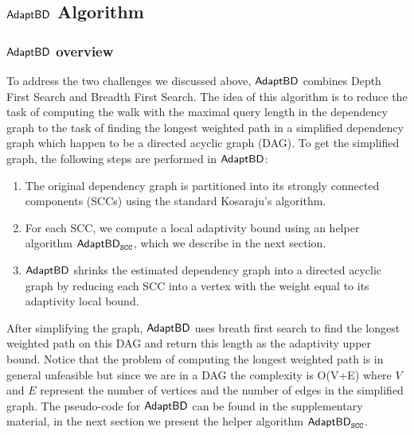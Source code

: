 \subsection{$\mathsf{AdaptBD}$ Algorithm}

\subsubsection{$\mathsf{AdaptBD}$ overview} To address the two challenges we discussed above,  $\mathsf{AdaptBD}$  combines
Depth First Search and Breadth First Search. 
The idea of this algorithm is to reduce the task of computing the
walk with the maximal query length in the dependency graph to the task of
finding the longest weighted path in a simplified dependency graph which happen to be a directed acyclic graph (DAG).
To get the simplified graph, the following steps are performed in $\mathsf{AdaptBD}$:
\begin{enumerate}
  \item The original dependency graph is partitioned into  
  its strongly connected components (SCCs) using the standard Kosaraju’s algorithm. 
  \item  For each SCC, we compute a local adaptivity bound using an helper algorithm $\mathsf{AdaptBD}_{\mathtt{SCC}}$, which we describe in the next section.
  \item  $\mathsf{AdaptBD}$ shrinks the estimated dependency graph into a directed acyclic graph
  by reducing each SCC into a vertex with the weight equal to its adaptivity local bound.
\end{enumerate}
After simplifying the graph, $\mathsf{AdaptBD}$ uses breath first search  to find the longest
weighted path on this DAG and return this length as the adaptivity upper bound. Notice that the problem of computing the longest weighted path is in general unfeasible but since we are in a DAG the complexity is O(V+E) where $V$ and $E$ represent the number of vertices and the number of edges 
in the simplified graph. The pseudo-code for $\mathsf{AdaptBD}$ can be found in the supplementary material, in the next section we present the helper algorithm $\mathsf{AdaptBD}_{\mathtt{SCC}}$.


